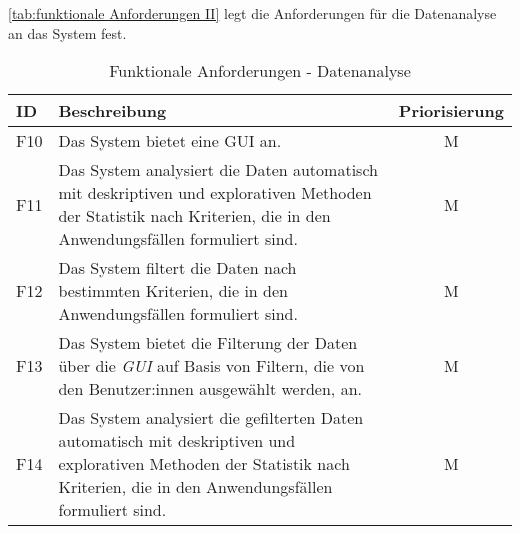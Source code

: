 \autoref{tab:funktionale Anforderungen II} legt die Anforderungen  für die Datenanalyse an das System fest.

\begingroup
\setlength{\tabcolsep}{10pt} %
\renewcommand{\arraystretch}{1.25} 
\begin{table}[h]
    \centering
    \begin{adjustbox}{max width=\textwidth}
    \begin{tabular}{lp{15cm}c}
       \toprule
       \textbf{ID}          & \textbf{Beschreibung} &\textbf{Priorisierung}\\
       \midrule
        F10                              &Das System bietet eine \acrfull{GUI} an.  & M\\
        F11                              &Das System analysiert die Daten automatisch mit deskriptiven und explorativen Methoden der Statistik nach Kriterien, die in den Anwendungsfällen formuliert sind.  & M\\
        F12                              &Das System filtert die Daten nach bestimmten Kriterien, die in den Anwendungsfällen formuliert sind.  & M\\ %
        F13                              &Das System bietet die Filterung der Daten über die \textit{\acrshort{GUI}} auf Basis von Filtern, die von den Benutzer:innen ausgewählt werden, an.  & M\\
        F14                              &Das System analysiert die gefilterten Daten automatisch mit deskriptiven und explorativen Methoden der Statistik nach Kriterien, die in den Anwendungsfällen formuliert sind. & M\\                             
        \bottomrule
    \end{tabular}
    \end{adjustbox}
    \caption{%
        Funktionale Anforderungen - Datenanalyse
    }
    \label{tab:funktionale Anforderungen II}
    \end{table}
\endgroup


